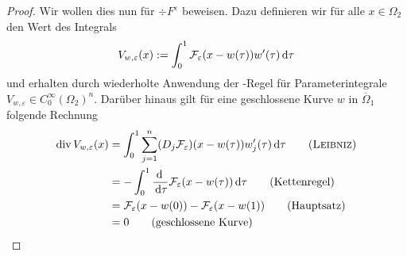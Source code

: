 \begin{proof}
  Wir wollen dies nun für $\div F^\varepsilon$ beweisen.
  Dazu definieren wir für alle $x\in\Omega_2$ den Wert des Integrals
  $$
  V_{w,\varepsilon}(x) := \int_0^1 \mathcal{F}_\varepsilon(x - w(\tau))w'(\tau)\, {\operatorname{d}\!{\tau}}
  $$
  und erhalten durch wiederholte Anwendung der \leibniz\hyp{}Regel für Parameterintegrale $ V_{w,\varepsilon} \in C_0^\infty(\Omega_2)^n$.
  Darüber hinaus gilt für eine geschlossene Kurve $w$ in $\overline\Omega_1$ folgende Rechnung
  \begingroup
  \addtolength{\jot}{0.5em}
  \begin{align*}
    \div V_{w,\varepsilon}(x) 
    &= \int_0^1 \sum_{j=1}^n (D_j \mathcal{F}_\varepsilon)(x - w(\tau))w_j'(\tau) \d\tau \tag{\leibniz}\\
    &= -\int_0^1 \frac{\d\ }{\d\tau}\mathcal{F}_\varepsilon(x - w(\tau)) \d\tau \tag{Kettenregel}\\
    &= \mathcal{F}_\varepsilon(x - w(0)) - \mathcal{F}_\varepsilon(x - w(1)) \tag{Hauptsatz}\\
    &= 0 \tag{geschlossene Kurve}
  \end{align*}
  \endgroup


\end{proof}
